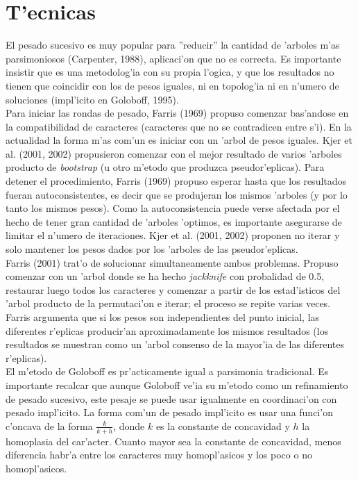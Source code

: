 \section*{T'ecnicas}
El pesado sucesivo es muy popular para ''reducir'' la cantidad de 'arboles m'as parsimoniosos (Carpenter, 1988), aplicaci'on que no es correcta. Es importante insistir que es una metodolog'ia con su propia l'ogica, y que los resultados no tienen que coincidir con los de pesos iguales, ni en topolog'ia ni en n'umero de soluciones (impl'icito en Goloboff, 1995).\\
Para iniciar las rondas de pesado, Farris (1969) propuso comenzar bas'andose en la compatibilidad de caracteres (caracteres que no se contradicen entre s'i). En la actualidad la forma m'as com'un es iniciar con un 'arbol de pesos iguales. Kjer et al. (2001, 2002) propusieron comenzar con el mejor resultado de varios 'arboles producto de \textit{bootstrap}
 (u otro m'etodo que produzca pseudor'eplicas).  Para detener el procedimiento, Farris (1969) propuso esperar hasta que los resultados fueran autoconsistentes, es decir que se produjeran los mismos 'arboles (y por lo tanto los mismos pesos). Como la autoconsistencia puede verse afectada por el hecho de tener gran cantidad de 'arboles 'optimos, es importante asegurarse de limitar el n'umero de iteraciones. Kjer et al. (2001, 2002) proponen no iterar y solo mantener los pesos dados por los 'arboles de las pseudor'eplicas.\\
Farris (2001) trat'o de solucionar simultaneamente ambos problemas. Propuso comenzar con un 'arbol donde se ha hecho \textit{jackknife} con probalidad de 0.5, restaurar luego todos los caracteres y comenzar a partir de los estad'isticos del 'arbol producto de la permutaci'on e iterar; el proceso se repite varias veces. Farris argumenta que si los pesos son independientes del punto inicial, las diferentes r'eplicas producir'an aproximadamente los mismos resultados (los resultados se muestran como un 'arbol consenso de la mayor'ia de las diferentes r'eplicas).\\
El m'etodo de Goloboff es pr'acticamente igual a parsimonia tradicional. Es importante recalcar que aunque Goloboff ve'ia su m'etodo como un refinamiento de pesado sucesivo, este pesaje se puede usar igualmente en coordinaci'on con pesado impl'icito. La forma com'un de pesado impl'icito es usar una funci'on c'oncava de la forma $\frac{k}{k + h}$, donde $k$ es la constante de concavidad y $h$ la homoplasia del car'acter. Cuanto mayor sea la constante de concavidad, menos diferencia habr'a entre los caracteres muy homopl'asicos y los poco o no homopl'asicos.

